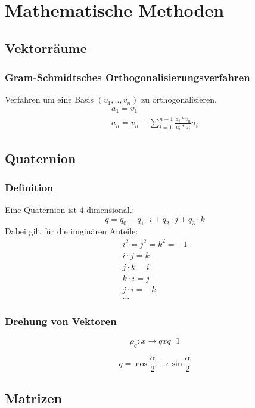 \chapter{Mathematische Methoden}
\section{Vektorräume}
\subsection{Gram-Schmidtsches Orthogonalisierungsverfahren}
Verfahren um eine Basis $\left( v_1, .., v_n\right)$ zu orthogonalisieren.
\begin{gather}
a_1=v_1 \\
    a_n=v_n - \sum_{i=1}^{n-1} \frac{a_i*v_n}{a_i*a_i}a_i 
    \end{gather}

    \section{Quaternion}
    \subsection{Definition}
    Eine Quaternion ist $4$-dimensional.:
    \begin{equation}
    q=q_0+q_1\cdot i+q_2\cdot j+q_3\cdot k
    \end{equation}
    Dabei gilt für die imginären Anteile:
    \begin{gather*}
    i^2=j^2=k^2=-1\\
	i\cdot j=k\\
	j\cdot k=i\\
	k \cdot i=j\\
	j \cdot i= -k\\
	\dots
	\end{gather*}

	\subsection{Drehung von Vektoren}
	\begin{equation}
	\rho_q:x\rightarrow qxq^-1
	\end{equation}

	\begin{equation}
	q=\cos{\frac{\alpha}{2}} + \epsilon \sin{\frac{\alpha}{2}}
	\end{equation}
	\section{Matrizen}
